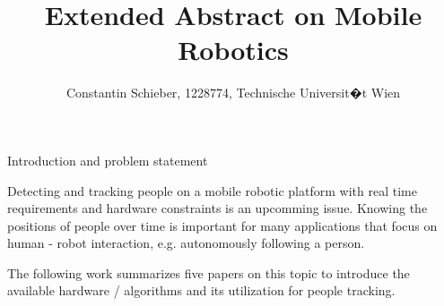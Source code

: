 \documentclass[a4paper,oneside,10pt,DIV12,headsepline,footexclude,headexclude]{scrartcl}
\newif\ifpdf
\let\ifpdf\relax
\begin{document}
\ifpdf
\else
\fi


\pagestyle{plain} %

\title{\Large Extended Abstract on Mobile Robotics}

\author{\large Constantin Schieber, 1228774, Technische Universit�t Wien}

\maketitle

\begin{section}{Introduction and problem statement}

Detecting and tracking people on a mobile robotic platform with real time
requirements and hardware constraints is an upcomming issue.
Knowing the positions of people over time is important for many applications that
focus on human - robot interaction, e.g. autonomously following a person.

The following work summarizes five papers on this topic to introduce the 
available hardware / algorithms and its utilization for people tracking.

\end{section}
\end{document}
